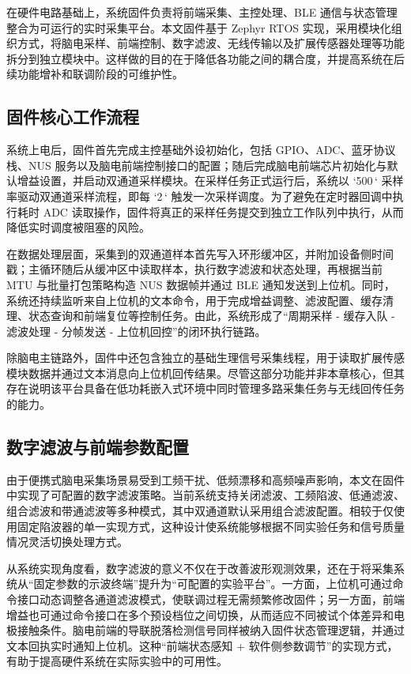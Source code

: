 在硬件电路基础上，系统固件负责将前端采集、主控处理、BLE 通信与状态管理整合为可运行的实时采集平台。本文固件基于 Zephyr RTOS 实现，采用模块化组织方式，将脑电采样、前端控制、数字滤波、无线传输以及扩展传感器处理等功能拆分到独立模块中。这样做的目的在于降低各功能之间的耦合度，并提高系统在后续功能增补和联调阶段的可维护性。

\subsection{固件核心工作流程}

系统上电后，固件首先完成主控基础外设初始化，包括 GPIO、ADC、蓝牙协议栈、NUS 服务以及脑电前端控制接口的配置；随后完成脑电前端芯片初始化与默认增益设置，并启动双通道采样模块。在采样任务正式运行后，系统以 `500\,` 采样率驱动双通道采样流程，即每 `2\,` 触发一次采样调度。为了避免在定时器回调中执行耗时 ADC 读取操作，固件将真正的采样任务提交到独立工作队列中执行，从而降低实时调度被阻塞的风险。

在数据处理层面，采集到的双通道样本首先写入环形缓冲区，并附加设备侧时间戳；主循环随后从缓冲区中读取样本，执行数字滤波和状态处理，再根据当前 MTU 与批量打包策略构造 NUS 数据帧并通过 BLE 通知发送到上位机。同时，系统还持续监听来自上位机的文本命令，用于完成增益调整、滤波配置、缓存清理、状态查询和前端复位等控制任务。由此，系统形成了“周期采样 - 缓存入队 - 滤波处理 - 分帧发送 - 上位机回控”的闭环执行链路。

除脑电主链路外，固件中还包含独立的基础生理信号采集线程，用于读取扩展传感模块数据并通过文本消息向上位机回传结果。尽管这部分功能并非本章核心，但其存在说明该平台具备在低功耗嵌入式环境中同时管理多路采集任务与无线回传任务的能力。

\subsection{数字滤波与前端参数配置}

由于便携式脑电采集场景易受到工频干扰、低频漂移和高频噪声影响，本文在固件中实现了可配置的数字滤波策略。当前系统支持关闭滤波、工频陷波、低通滤波、组合滤波和带通滤波等多种模式，其中双通道默认采用组合滤波配置。相较于仅使用固定陷波器的单一实现方式，这种设计使系统能够根据不同实验任务和信号质量情况灵活切换处理方式。

从系统实现角度看，数字滤波的意义不仅在于改善波形观测效果，还在于将采集系统从“固定参数的示波终端”提升为“可配置的实验平台”。一方面，上位机可通过命令接口动态调整各通道滤波模式，使联调过程无需频繁修改固件；另一方面，前端增益也可通过命令接口在多个预设档位之间切换，从而适应不同被试个体差异和电极接触条件。脑电前端的导联脱落检测信号同样被纳入固件状态管理逻辑，并通过文本回执实时通知上位机。这种“前端状态感知 + 软件侧参数调节”的实现方式，有助于提高硬件系统在实际实验中的可用性。

